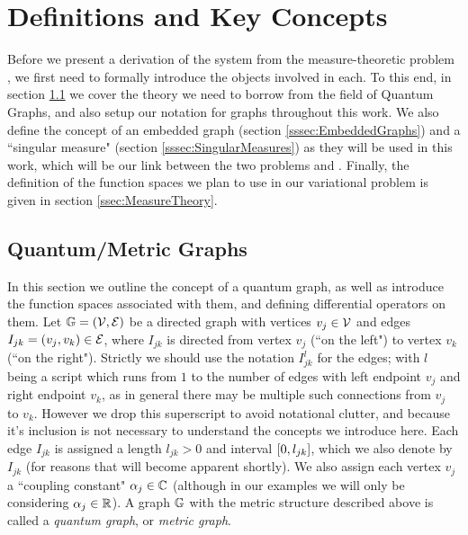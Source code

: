 \section{Definitions and Key Concepts} \label{sec:Definitions}
Before we present a derivation of the system  from the measure-theoretic problem , we first need to formally introduce the objects involved in each.
To this end, in section \ref{ssec:QuantumGraphs} we cover the theory we need to borrow from the field of Quantum Graphs, and also setup our notation for graphs throughout this work.
We also define the concept of an embedded graph (section \ref{sssec:EmbeddedGraphs}) and a ``singular measure" (section \ref{sssec:SingularMeasures}) as they will be used in this work, which will be our link between the two problems  and .
Finally, the definition of the function spaces we plan to use in our variational problem  is given in section \ref{ssec:MeasureTheory}.

\subsection{Quantum/Metric Graphs} \label{ssec:QuantumGraphs}
In this section we outline the concept of a quantum graph, as well as introduce the function spaces associated with them, and defining differential operators on them.
Let $\mathbb{G}=\left( \mathcal{V},\mathcal{E} \right)$ be a directed graph with vertices $v_j\in \mathcal{V}$ and edges $I_{jk}=\left( v_j, v_k \right)\in \mathcal{E}$, where $I_{jk}$ is directed from vertex $v_j$ (``on the left") to vertex $v_k$ (``on the right").
Strictly we should use the notation $I_{jk}^l$ for the edges; with $l$ being a script which runs from $1$ to the number of edges with left endpoint $v_j$ and right endpoint $v_k$, as in general there may be multiple such connections from $v_j$ to $v_k$.
However we drop this superscript to avoid notational clutter, and because it's inclusion is not necessary to understand the concepts we introduce here.
Each edge $I_{jk}$ is assigned a length $l_{jk}>0$ and interval $\left[ 0,l_{jk} \right]$, which we also denote by $I_{jk}$ (for reasons that will become apparent shortly).
We also assign each vertex $v_j$ a ``coupling constant" $\alpha_j\in\mathbb{C}$ (although in our examples we will only be considering $\alpha_j\in\mathbb{R}$).
A graph $\mathbb{G}$ with the metric structure described above is called a \emph{quantum graph}, or \emph{metric graph}. 

